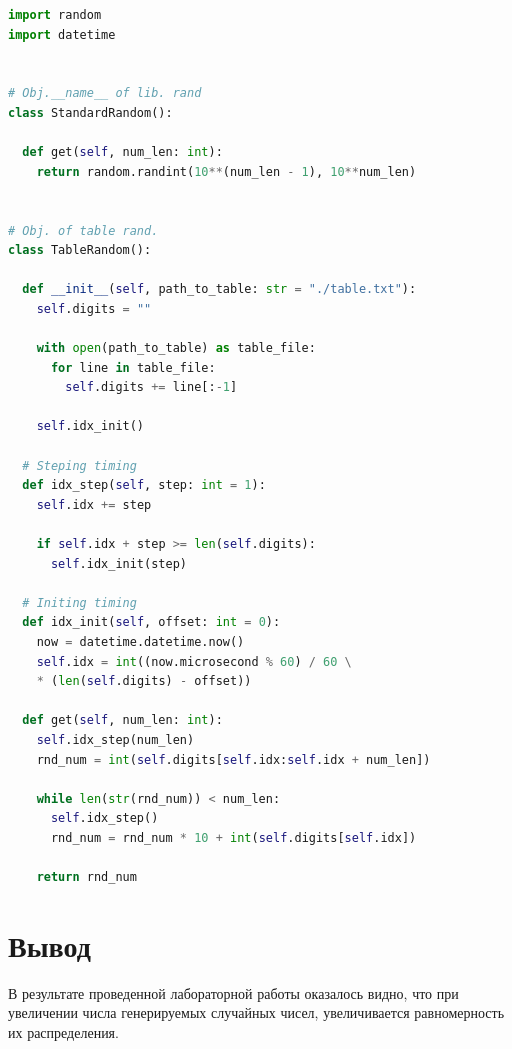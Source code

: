 \documentclass[a4paper, 12pt]{article}
\begin{document}
\begin{lstlisting}[language=Python, caption = Программная реализация генерации псевдослучайных чисел программным и табличным методом (my_random.py)]
import random
import datetime


# Obj.__name__ of lib. rand
class StandardRandom():

  def get(self, num_len: int):
    return random.randint(10**(num_len - 1), 10**num_len)


# Obj. of table rand.
class TableRandom():

  def __init__(self, path_to_table: str = "./table.txt"):
    self.digits = ""

    with open(path_to_table) as table_file:
      for line in table_file:
        self.digits += line[:-1]

    self.idx_init()

  # Steping timing
  def idx_step(self, step: int = 1):
    self.idx += step

    if self.idx + step >= len(self.digits):
      self.idx_init(step)

  # Initing timing
  def idx_init(self, offset: int = 0):
    now = datetime.datetime.now()
    self.idx = int((now.microsecond % 60) / 60 \
    * (len(self.digits) - offset))

  def get(self, num_len: int):
    self.idx_step(num_len)
    rnd_num = int(self.digits[self.idx:self.idx + num_len])

    while len(str(rnd_num)) < num_len:
      self.idx_step()
      rnd_num = rnd_num * 10 + int(self.digits[self.idx])

    return rnd_num
\end{lstlisting}
\section{Вывод}
\hspace*{5mm} В результате проведенной лабораторной работы оказалось видно, что при увеличении числа генерируемых случайных чисел, увеличивается равномерность их распределения.
\end{document}
